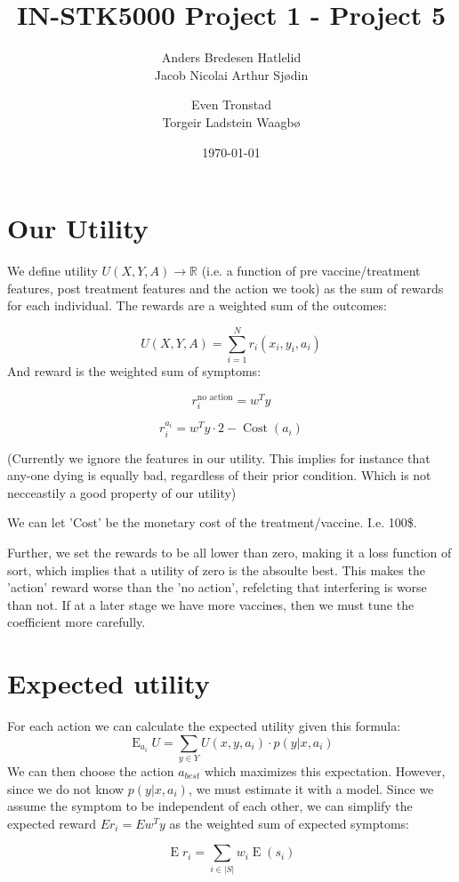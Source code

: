 \documentclass{article}
\title{IN-STK5000 Project 1 - Project 5}
\author{Anders Bredesen Hatlelid \\
        Jacob Nicolai Arthur Sjødin \\
        \and
        Even Tronstad \\
        Torgeir Ladstein Waagbø 
}
\date{\today}
\begin{document}
\maketitle


\section{Our Utility}

We define utility $U(X, Y, A)\to\mathbb{R}$ (i.e. a function of pre vaccine/treatment features, post treatment features and the action we took) as the sum of rewards for each individual. The rewards are a weighted sum of the outcomes:

$$
U(X,Y,A) = \sum_{i=1}^{N}r_i(x_i, y_i, a_i)
$$
And reward is the weighted sum of symptoms:

$$
r_i^{\text{no action}} = w^Ty
$$

$$
r_i^{a_i} = w^Ty\cdot2 - \operatorname{Cost} (a_i)
$$

(Currently we ignore the features in our utility. This implies for instance that any-one dying is equally bad, regardless of their prior condition. Which is not necceastily a good property of our utility)

We can let 'Cost' be the monetary cost of the treatment/vaccine. I.e. 100\$.

Further, we set the rewards to be all lower than zero, making it a loss function of sort, which implies that a utility of zero is the absoulte best. This makes the 'action' reward worse than the 'no action', refelcting that interfering is worse than not. If at a later stage we have more vaccines, then we must tune the coefficient more carefully.

\section{Expected utility}
For each action we can calculate the expected utility given this formula:
$$
\operatorname{E}_{a_i} U = \sum_{y\in Y}U(x, y, a_i)\cdot p(y|x, a_i)
$$
We can then choose the action $a_{best}$ which maximizes this expectation. However, since we do not know $p(y|x,a_i)$, we must estimate it with a model.
Since we assume the symptom to be independent of each other, we can simplify the expected reward $Er_i = Ew^Ty$ as the weighted sum
of expected symptoms:

\begin{equation}
    \operatorname{E}r_i = \sum_{i \in |S|} w_i\operatorname{E}(s_i)
\end{equation}
\end{document}
